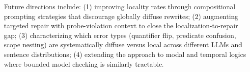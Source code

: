\documentclass[11pt,letterpaper]{article}
\begin{document}
Future directions include: (1) improving locality rates through compositional prompting strategies that discourage globally diffuse rewrites; (2) augmenting targeted repair with probe-violation context to close the localization-to-repair gap; (3) characterizing which error types (quantifier flip, predicate confusion, scope nesting) are systematically diffuse versus local across different LLMs and sentence distributions; (4) extending the approach to modal and temporal logics where bounded model checking is similarly tractable.



\end{document}
